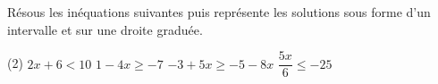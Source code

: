 %
%
    Résous les inéquations suivantes puis représente les solutions sous forme d'un intervalle et sur une droite graduée.
    \begin{tasks}(2)
        \task \(2x+6<10\)
        \task \(1-4x \ge -7\)
        \task \(-3 + 5x \ge -5 - 8x\)
        \task \(\dfrac{5x}{6} \le -25\)
    \end{tasks}
